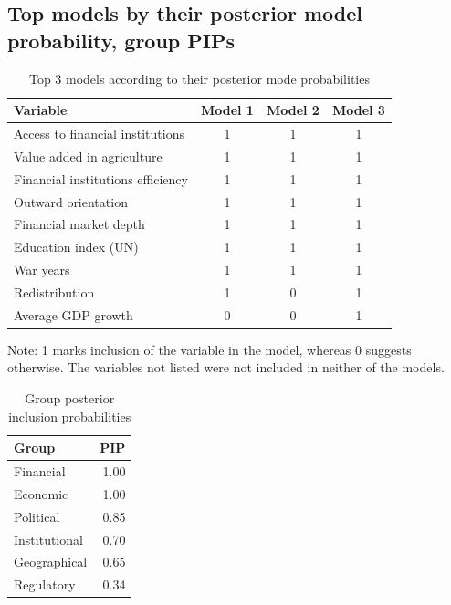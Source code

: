 \documentclass[a4paper,11pt]{article}
\begin{document}
\subsection*{Top models by their posterior model probability, group PIPs}
\begin{table}[!htbp]
\centering
\caption{Top 3 models according to their posterior mode probabilities}
\label{table:top3}
%
\begin{threeparttable}
%
\begin{tabularx}{0.7\linewidth}{lccc}
  \toprule
Variable & Model 1 & Model 2 & Model 3 \\ 
  \midrule
Access to financial institutions & 1 & 1 & 1 \\
Value added in agriculture & 1 & 1 & 1 \\ 
Financial institutions efficiency & 1 & 1 & 1 \\
Outward orientation & 1 & 1 & 1 \\
Financial market depth & 1 & 1 & 1 \\
Education index (UN) & 1 & 1 & 1 \\
War years & 1 & 1 & 1 \\
Redistribution & 1 & 0 & 1 \\
Average GDP growth & 0 & 0 & 1 \\
  \bottomrule
\end{tabularx}
%
\begin{tablenotes}
\footnotesize													
\item Note: 1 marks inclusion of the variable in the model, whereas 0 suggests otherwise. The variables not listed were not included in neither of the models.
\end{tablenotes}
\end{threeparttable}
\end{table}			

\begin{table}[ht!]
\caption{Group posterior inclusion probabilities}
\label{tab:grouppips}
\centering
\begin{tabular}{lr}
  \toprule
Group & PIP \\ 
  \midrule
  Financial & 1.00 \\ 
  Economic & 1.00 \\ 
  Political & 0.85 \\ 
  Institutional & 0.70 \\ 
  Geographical & 0.65 \\ 
  Regulatory & 0.34 \\ 
   \bottomrule
\end{tabular}
\end{table}
\clearpage
\end{document}
